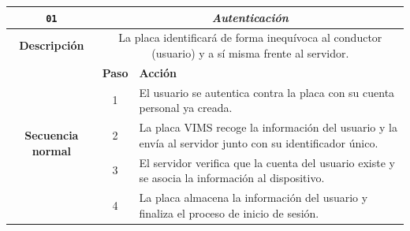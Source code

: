 \begin{table}[H]
  \centering
  \begin{tabularx}{\textwidth}{|c|c|X|}
    \hline
    \texttt{01}                                & \multicolumn{2}{c|}{\textit{Autenticación}}                                                                                                                                                                                                                 \\
    \hline
    \textbf{Descripción}                       & \multicolumn{2}{X|}{La placa identificará de forma inequívoca al conductor (usuario) y a sí misma frente al servidor.}                                                                                                                                      \\
    \hline
    \multirow{9}{*}{\textbf{Secuencia normal}} & \textbf{Paso}                                                                                                          & \textbf{Acción}                                                                                                                    \\
    \cline{2-3}
                                               & 1                                                                                                                      & \multicolumn{1}{L|}{El usuario se autentica contra la placa con su cuenta personal ya creada.}                                     \\
    \cline{2-3}
                                               & 2                                                                                                                      & \multicolumn{1}{L|}{La placa \ac{VIMS} recoge la información del usuario y la envía al servidor junto con su identificador único.} \\
    \cline{2-3}
                                               & 3                                                                                                                      & \multicolumn{1}{L|}{El servidor verifica que la cuenta del usuario existe y se asocia la información al dispositivo.}              \\
    \cline{2-3}
                                               & 4                                                                                                                      & \multicolumn{1}{L|}{La placa almacena la información del usuario y finaliza el proceso de inicio de sesión.}                       \\

\end{tabularx}
\end{table}
